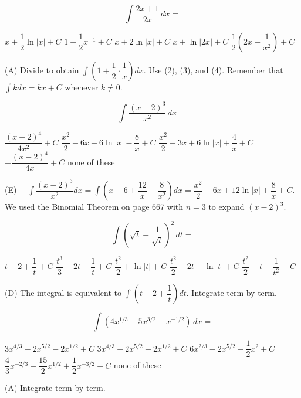 \question
\[
\displaystyle\int \dfrac{2 x+1}{2 x} \,dx=
\]
\begin{choices}
  \CorrectChoice $x+\dfrac{1}{2} \ln |x|+C$
  \choice $1+\dfrac{1}{2} x^{-1}+C$
  \choice $x+2 \ln |x|+C$
  \choice $x+\ln |2 x|+C$
  \choice $\dfrac{1}{2}\left(2 x-\dfrac{1}{x^{2}}\right)+C$
\end{choices}
\begin{solution}
(A) Divide to obtain $\displaystyle\int\left(1+\dfrac{1}{2} \cdot \dfrac{1}{x}\right) d x$. Use (2), (3), and (4). Remember that $\displaystyle\int k d x=k x+C$ whenever $k \neq 0$.
\end{solution}

\question
\[
\displaystyle\int \dfrac{(x-2)^{3}}{x^{2}} \,dx=
\]
\begin{choices}
  \choice $\dfrac{(x-2)^{4}}{4 x^{2}}+C$
  \choice $\dfrac{x^{2}}{2}-6 x+6 \ln |x|-\dfrac{8}{x}+C$
  \choice $\dfrac{x^{2}}{2}-3 x+6 \ln |x|+\dfrac{4}{x}+C$
  \choice $-\dfrac{(x-2)^{4}}{4 x}+C$
  \CorrectChoice none of these
\end{choices}
\begin{solution}
(E) $\quad \displaystyle\int \dfrac{(x-2)^{3}}{x^{2}} d x=\displaystyle\int\left(x-6+\dfrac{12}{x}-\dfrac{8}{x^{2}}\right) d x=\dfrac{x^{2}}{2}-6 x+12 \ln |x|+\dfrac{8}{x}+C$. We used the Binomial Theorem on page 667 with $n=3$ to expand $(x-2)^{3}$.
\end{solution}





\newpage


\question
\[
\displaystyle\int\left(\sqrt{t}-\dfrac{1}{\sqrt{t}}\right)^{2} \,dt=
\]
\begin{choices}
  \choice $t-2+\dfrac{1}{t}+C$
  \choice $\dfrac{t^{3}}{3}-2 t-\dfrac{1}{t}+C$
  \choice $\dfrac{t^{2}}{2}+\ln |t|+C$
  \CorrectChoice $\dfrac{t^{2}}{2}-2 t+\ln |t|+C$
  \choice $\dfrac{t^{2}}{2}-t-\dfrac{1}{t^{2}}+C$
\end{choices}
\begin{solution}
(D) The integral is equivalent to $\displaystyle\int\left(t-2+\dfrac{1}{t}\right) d t$. Integrate term by term.
\end{solution}

\question
\[
\displaystyle\int\left(4 x^{1 / 3}-5 x^{3 / 2}-x^{-1 / 2}\right) \,dx=
\]
\begin{choices}
  \CorrectChoice $3 x^{4 / 3}-2 x^{5 / 2}-2 x^{1 / 2}+C$
  \choice $3 x^{4 / 3}-2 x^{5 / 2}+2 x^{1 / 2}+C$
  \choice $6 x^{2 / 3}-2 x^{5 / 2}-\dfrac{1}{2} x^{2}+C$
  \choice $\dfrac{4}{3} x^{-2 / 3}-\dfrac{15}{2} x^{1 / 2}+\dfrac{1}{2} x^{-3 / 2}+C$
  \choice none of these
\end{choices}
\begin{solution}
(A) Integrate term by term.
\end{solution}




